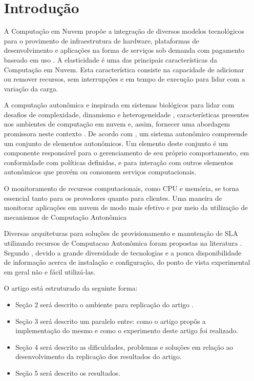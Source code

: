 \section{Introdução}
\label{sec:introducao}

A Computação em Nuvem propõe a integração de diversos modelos tecnológicos para o
provimento de infraestrutura de hardware, plataformas de desenvolvimento e aplicações
na forma de serviços sob demanda com pagamento baseado em uso \cite{sa:11}. A elasticidade é uma das principais características da Computação em Nuvem. Esta característica consiste na capacidade de adicionar ou remover recursos, sem interrupções e em tempo de execução para lidar com a variação da carga. 

A computação autonômica e inspirada em sistemas biológicos para lidar com desafios de complexidade, dinamismo e heterogeneidade \cite{kephart:03}, características presentes nos ambientes de computação em nuvem e, assim, fornecer uma abordagem promissora neste contexto \cite{sousa:11}. De acordo com \cite{kephart:03}, um sistema autonômico compreende um conjunto de elementos autonômicos. Um elemento deste conjunto é um componente responsável para o gerenciamento de seu próprio comportamento, em conformidade com políticas definidas, e para interação com outros elementos autonômicos que provém ou consomem serviços computacionais.

O monitoramento de recursos computacionais, como CPU e memória, se torna 
essencial tanto para os provedores quanto para clientes. Uma maneira de monitorar
aplicações em nuvem de modo mais efetivo e por meio da utilização de mecanismos de 
Computação Autonômica

Diversas arquiteturas para soluções de provisionamento e manutenção de 
SLA utilizando recursos de Computacao Autonômica foram propostas na literatura 
\cite{rego:12,tordsson:12}. Segundo \cite{coutinho_et_al:14}, devido a grande diversidade de tecnologias e a pouca disponibilidade de informação acerca de instalação e configuração, do ponto de vista experimental em geral não e fácil utilizá-las.

O artigo está estruturado da seguinte forma:
\begin{itemize}
  \item Seção 2 será descrito o ambiente para replicação do artigo \cite{coutinho_et_al:14}.
  \item Seção 3 será descrito um paralelo entre: como o artigo propôs a implementação do mesmo e como o experimento deste artigo foi realizado.
  \item Seção 4 será descrito as dificuldades, problemas e soluções em relação ao desenvolvimento da replicação dos resultados do artigo.
  \item Seção 5 será descrito os resultados.
\end{itemize}
